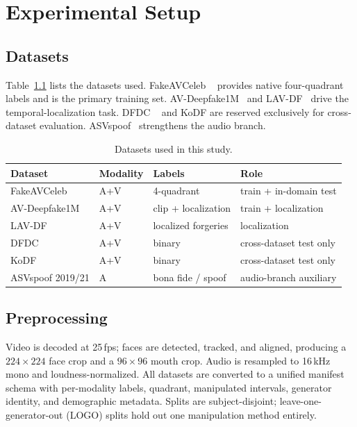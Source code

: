 \chapter{Experimental Setup}
\label{ch:setup}

\section{Datasets}
Table~\ref{tab:datasets} lists the datasets used. FakeAVCeleb%
~\cite{khalid2021fakeavceleb} provides native four-quadrant labels and is the
primary training set. AV-Deepfake1M~\cite{cai2023avdeepfake1m} and
LAV-DF~\cite{cai2022lavdf} drive the temporal-localization task. DFDC%
~\cite{dolhansky2020dfdc} and KoDF are reserved exclusively for cross-dataset
evaluation. ASVspoof~\cite{wang2020asvspoof} strengthens the audio branch.

\begin{table}[h]
\centering
\caption{Datasets used in this study.}
\label{tab:datasets}
\small
\begin{tabular}{llll}
\toprule
\textbf{Dataset} & \textbf{Modality} & \textbf{Labels} & \textbf{Role} \\
\midrule
FakeAVCeleb   & A+V & 4-quadrant           & train + in-domain test \\
AV-Deepfake1M & A+V & clip + localization   & train + localization \\
LAV-DF        & A+V & localized forgeries   & localization \\
DFDC          & A+V & binary                & cross-dataset test only \\
KoDF          & A+V & binary                & cross-dataset test only \\
ASVspoof 2019/21 & A & bona fide / spoof    & audio-branch auxiliary \\
\bottomrule
\end{tabular}
\end{table}

\section{Preprocessing}
Video is decoded at 25\,fps; faces are detected, tracked, and aligned, producing a
$224\times224$ face crop and a $96\times96$ mouth crop. Audio is resampled to
16\,kHz mono and loudness-normalized. All datasets are converted to a unified
manifest schema with per-modality labels, quadrant, manipulated intervals,
generator identity, and demographic metadata. Splits are subject-disjoint;
leave-one-generator-out (LOGO) splits hold out one manipulation method entirely.

